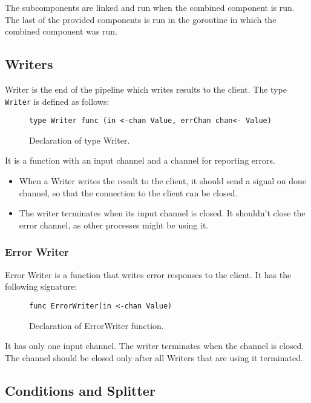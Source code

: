 \documentclass[12pt,a4paper]{article}
\begin{document}
The subcomponents are linked and run when the combined component is run. 
The last of the provided components is run in the goroutine in which
the combined component was run.

\subsection{Writers}
Writer is the end of the pipeline which writes results to the client.
The type \texttt{Writer} is defined as follows:

\begin{figure}[h]
\centering
\begin{lstlisting}
type Writer func (in <-chan Value, errChan chan<- Value)
\end{lstlisting}
\caption[scale=1.0]{Declaration of type Writer.}
\label{fig:Writer}
\end{figure}

It is a function with an input channel and a channel for reporting errors.
\begin{itemize}
	\item When a Writer writes the result to the client, it should send a signal
		  on done channel, so that the connection to the client can be closed.
	\item The writer terminates when its input channel is closed. It shouldn't
		  close the error channel, as other processes might be using it.
\end{itemize}

\subsubsection{Error Writer}
Error Writer is a function that writes error responses to the client.
It has the following signature:

\begin{figure}[h]
\centering
\begin{lstlisting}
func ErrorWriter(in <-chan Value)
\end{lstlisting}
\caption[scale=1.0]{Declaration of ErrorWriter function.}
\label{fig:ErrorWriter}
\end{figure}

It has only one input channel. The writer terminates when the channel
is closed. The channel should be closed only after all Writers that 
are using it terminated.

\subsection{Conditions and Splitter}
\end{document}
